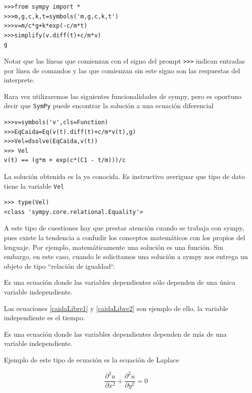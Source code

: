 \documentclass{article}
\begin{document}
\begin{lstlisting}
>>>from sympy import *
>>>m,g,c,k,t=symbols('m,g,c,k,t')
>>>v=m/c*g+k*exp(-c/m*t)
>>>simplify(v.diff(t)+c/m*v)
g
\end{lstlisting}
Notar que las líneas que comienzan con el signo del prompt \verb~>>>~ indican entradas por línea de comandos y las que comienzan sin este signo son las respuestas del interprete.

Rara vez utilizaremos las siguientes funcionalidades de sympy, pero es oportuno decir que
 \texttt{SymPy} puede encontrar la solución a una ecuación diferencial

\begin{lstlisting}
>>>v=symbols('v',cls=Function)
>>>EqCaida=Eq(v(t).diff(t)+c/m*v(t),g)
>>>Vel=dsolve(EqCaida,v(t))
>>> Vel
v(t) == (g*m + exp(c*(C1 - t/m)))/c
\end{lstlisting}

La solución obtenida es la ya conocida. Es instructivo averiguar que tipo de dato tiene la variable \verb~Vel~

\begin{lstlisting}
>>> type(Vel)
<class 'sympy.core.relational.Equality'>
\end{lstlisting}
A este tipo de cuestiones hay que prestar atención cuando se trabaja con sympy, pues existe la tendencia a confudir los conceptos matemáticos con los propios del lenguaje. Por ejemplo, matemáticamente una solución es una función. Sin embargo, en este caso, cuando le solicitamos una solución a sympy nos entrega un objeto de tipo  ``relación de igualdad``.





\begin{definicion} Es una ecuación donde las variables dependientes sólo dependen de una única variable independiente.
\end{definicion}

Las
ecuaciones \eqref{caidaLibre1} y \eqref{caidaLibre2} son ejemplo de ello, la variable independiente es el tiempo.
  \begin{definicion} Es una ecuación donde las variables dependientes dependen de más de una variable independiente.
   \end{definicion}

Ejemplo de este tipo de ecuación es la ecuación de Laplace

\[\frac{\partial^2 u}{\partial x^2}+\frac{\partial^2 u}{\partial y^2}=0\]
\end{document}
